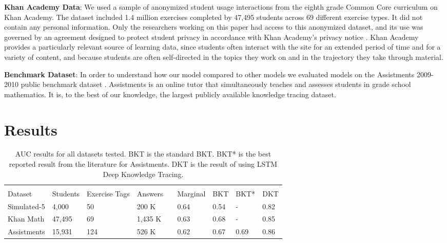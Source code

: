 \documentclass{article} \usepackage{nips,times}
\newcommand{\ra}[1]{\renewcommand{\arraystretch}{#1}}
\begin{document}
\textbf{Khan Academy Data}: We used a sample of anonymized student usage interactions from the eighth grade Common Core curriculum on Khan Academy. The dataset included 1.4 million exercises completed by 47,495 students across 69 different exercise types. It did not contain any personal information. Only the researchers working on this paper had access to this anonymized dataset, and its use was governed by an agreement designed to protect student privacy in accordance with Khan Academy’s privacy notice \cite{KAprivacy}. Khan Academy provides a particularly relevant source of learning data, since students often interact with the site for an extended period of time and for a variety of content, and because students are often self-directed in the topics they work on and in the trajectory they take through material.





\textbf{Benchmark Dataset}: In order to understand how our model compared to other models we evaluated models on the Assistments 2009-2010 public benchmark dataset \cite{feng2009addressing}. Assistments is an online tutor that simultaneously teaches and assesses students in grade school mathematics. It is, to the best of our knowledge, the largest publicly available knowledge tracing dataset.

\section{Results}\label{sec results}

\begin{table*}\centering
\ra{1.3}
\begin{tabular}{@{}llllcllll@{}}
\toprule
& \multicolumn{3}{c}{} & \phantom{abc} &
 \multicolumn{4}{c}{} \\
\cmidrule{2-4} 
\cmidrule{6-9}  
Dataset & Students & Exercise Tags & Answers && Marginal & BKT & BKT* & DKT \\ 
\midrule
Simulated-5 & 4,000 & 50 & 200 K && 0.64 & 0.54 & - & 0.82 \\
Khan Math  & 47,495 & 69 & 1,435 K && 0.63 & 0.68 & - & 0.85 \\
Assistments & 15,931 & 124 & 526 K && 0.62 & 0.67 & 0.69 & 0.86 \\
\bottomrule
\end{tabular}
\caption{AUC results for all datasets tested. BKT is the standard BKT. BKT* is the best reported result from the literature for Assistments. DKT is the result of using LSTM Deep Knowledge Tracing.
\label{table:results}
}
\vspace{-3mm}
\end{table*}
\end{document}
